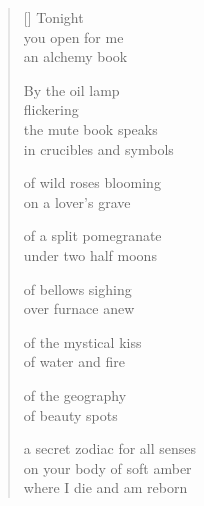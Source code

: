 \documentclass[12pt,a4paper]{article}
\begin{document}
\begin{verse}[\versewidth]
  Tonight \\
  you open for me \\
  an alchemy book

  By the oil lamp \\
  flickering \\
  the mute book speaks \\
  in crucibles and symbols

  of wild roses blooming \\
  on a lover's grave

  of a split pomegranate \\
  under two half moons

  of bellows sighing \\
  over furnace anew

  of the mystical kiss \\
  of water and fire

  of the geography \\
  of beauty spots

  a secret zodiac for all senses \\
  on your body of soft amber \\
  where I die and am reborn
\end{verse}


\newpage

\poemtitle{}

\settowidth{\versewidth}{would ascend into the starry night}

\bigskip
\end{document}
